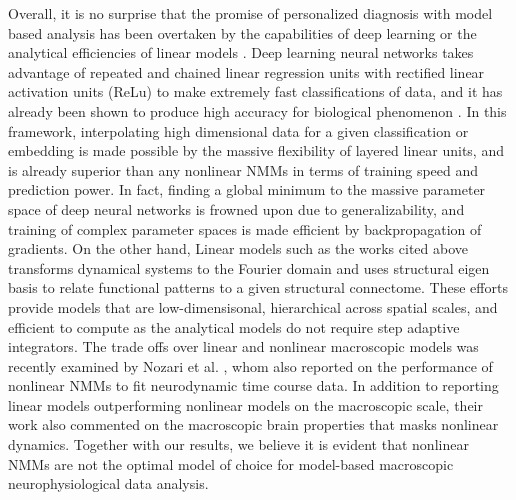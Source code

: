 Overall, it is no surprise that the promise of personalized diagnosis with model based analysis has been overtaken by the capabilities of deep learning or the analytical efficiencies of linear models \cite{Becker2018, raj_spectral_2020}. Deep learning neural networks takes advantage of repeated and chained linear regression units with rectified linear activation units (ReLu) to make extremely fast classifications of data, and it has already been shown to produce high accuracy for biological phenomenon \cite{pulvermuller_biological_2021, parmar_spatiotemporal_2020}. In this framework, interpolating high dimensional data for a given classification or embedding is made possible by the massive flexibility of layered linear units, and is already superior than any nonlinear NMMs in terms of training speed and prediction power. In fact, finding a global minimum to the massive parameter space of deep neural networks is frowned upon due to generalizability, and training of complex parameter spaces is made efficient by backpropagation of gradients. On the other hand, Linear models such as the works cited above transforms dynamical systems to the Fourier domain and uses structural eigen basis to relate functional patterns to a given structural connectome. These efforts provide models that are low-dimensisonal, hierarchical across spatial scales, and efficient to compute as the analytical models do not require step adaptive integrators. The trade offs over linear and nonlinear macroscopic models was recently examined by Nozari et al. \cite{nozari_is_2020}, whom also reported on the performance of nonlinear NMMs to fit neurodynamic time course data. In addition to reporting linear models outperforming nonlinear models on the macroscopic scale, their work also commented on the macroscopic brain properties that masks nonlinear dynamics. Together with our results, we believe it is evident that nonlinear NMMs are not the optimal model of choice for model-based macroscopic neurophysiological data analysis.

